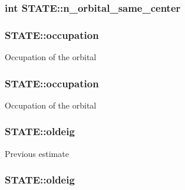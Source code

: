 \hypertarget{struct_s_t_a_t_e_a58de639bd7969415efdf6c8ef99a1e9a}{
\subsubsection[{n\-\_\-orbital\-\_\-same\-\_\-center}]{\setlength{\rightskip}{0pt plus 5cm}int S\-T\-A\-T\-E\-::n\-\_\-orbital\-\_\-same\-\_\-center}}\label{struct_s_t_a_t_e_a58de639bd7969415efdf6c8ef99a1e9a}
\hypertarget{struct_s_t_a_t_e_a7c40eee5f2b5a6dfb4c707899b87daba}{
\subsubsection[{occupation}]{ S\-T\-A\-T\-E\-::occupation}}\label{struct_s_t_a_t_e_a7c40eee5f2b5a6dfb4c707899b87daba}
Occupation of the orbital \hypertarget{struct_s_t_a_t_e_a285be9a57aa6330434e5e4841879c9ec}{
\subsubsection[{occupation}]{ S\-T\-A\-T\-E\-::occupation}}\label{struct_s_t_a_t_e_a285be9a57aa6330434e5e4841879c9ec}
Occupation of the orbital \hypertarget{struct_s_t_a_t_e_a36e9f9a7dc0c241ea52d6fce40d807f1}{
\subsubsection[{oldeig}]{ S\-T\-A\-T\-E\-::oldeig}}\label{struct_s_t_a_t_e_a36e9f9a7dc0c241ea52d6fce40d807f1}
Previous estimate \hypertarget{struct_s_t_a_t_e_a56092f05691245b641d24c7fbf39d30b}{
\subsubsection[{oldeig}]{ S\-T\-A\-T\-E\-::oldeig}}\label{struct_s_t_a_t_e_a56092f05691245b641d24c7fbf39d30b}
